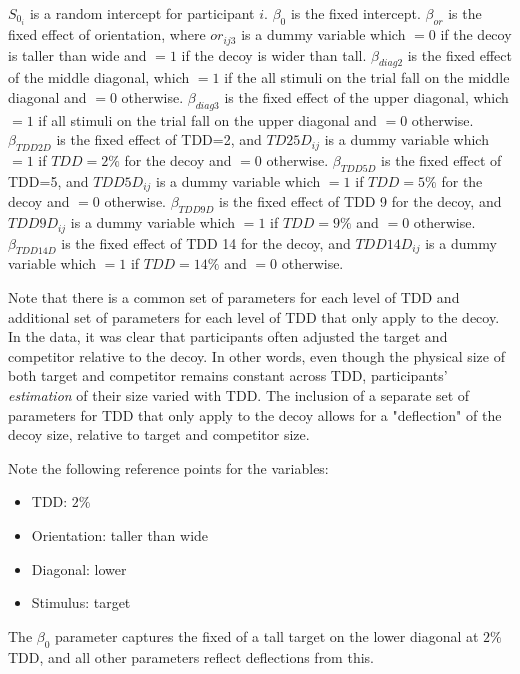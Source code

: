 $S_{0_i}$ is a random intercept for participant $i$. $\beta_{0}$ is the fixed intercept. $\beta_{or}$ is the fixed effect of orientation, where $or_{ij3}$ is a dummy variable which $=0$ if the decoy is taller than wide and $=1$ if the decoy is wider than tall. $\beta_{diag2}$ is the fixed effect of the middle diagonal, which $=1$ if the all stimuli on the trial fall on the middle diagonal and $=0$ otherwise. $\beta_{diag3}$ is the fixed effect of the upper diagonal, which $=1$ if all stimuli on the trial fall on the upper diagonal and $=0$ otherwise. $\beta_{TDD2D}$ is the fixed effect of TDD=2, and $TD25D_{ij}$ is a dummy variable which $=1$ if $TDD=2\%$ for the decoy and $=0$ otherwise.  $\beta_{TDD5D}$ is the fixed effect of TDD=5, and $TDD5D_{ij}$ is a dummy variable which $=1$ if $TDD=5\%$ for the decoy and $=0$ otherwise. $\beta_{TDD9D}$ is the fixed effect of TDD 9 for the decoy, and $TDD9D_{ij}$ is a dummy variable which $=1$ if $TDD=9\%$ and $=0$ otherwise. $\beta_{TDD14D}$ is the fixed effect of TDD 14 for the decoy, and $TDD14D_{ij}$ is a dummy variable which $=1$ if $TDD=14\%$ and $=0$ otherwise. 

Note that there is a common set of parameters for each level of TDD and additional set of parameters for each level of TDD that only apply to the decoy. In the data, it was clear that participants often adjusted the target and competitor relative to the decoy. In other words, even though the physical size of both target and competitor remains constant across TDD, participants' \textit{estimation} of their size varied with TDD. The inclusion of a separate set of parameters for TDD that only apply to the decoy allows for a "deflection" of the decoy size, relative to target and competitor size. 

Note the following reference points for the variables:
\begin{itemize}
    \item TDD: $2\%$
    \item Orientation: taller than wide
    \item Diagonal: lower
    \item Stimulus: target
\end{itemize}

The $\beta_{0}$ parameter captures the fixed of a tall target on the lower diagonal at $2\%$ TDD, and all other parameters reflect deflections from this.

